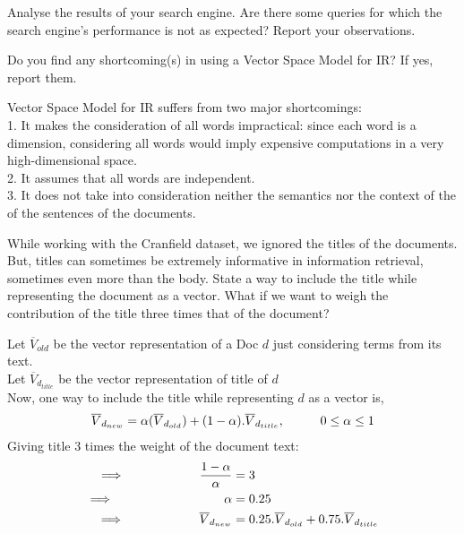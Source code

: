 \documentclass[11pt]{exam}
\newcommand\tab[1][1cm]{\hspace*{#1}}
\begin{document}
\begin{questions}
\question Analyse the results of your search engine. Are there some queries for which the search
engine’s performance is not as expected? Report your observations.


\question Do you find any shortcoming(s) in using a Vector Space Model for IR? If yes, report them.
\begin{solution}
    Vector Space Model for IR suffers from two major shortcomings:\\
    1. It makes the consideration of all words impractical: since each word is a dimension, considering all words would imply expensive computations in a very high-dimensional space.\\
    2. It assumes that all words are independent.\\
    3. It does not take into consideration neither the semantics nor the context of the of the sentences of the documents.
    
\end{solution}

\question While working with the Cranfield dataset, we ignored the titles of the documents. But,
titles can sometimes be extremely informative in information retrieval, sometimes even
more than the body. State a way to include the title while representing the document as
a vector. What if we want to weigh the contribution of the title three times that of the
document?
\begin{solution}
    Let $\overline{V}_{old}$ be the vector representation of a Doc $d$ just considering terms from its text.\\
    Let $\overline{V}_{d_{title}}$ be the vector representation of title of $d$\\
    Now, one way to include the title while representing $d$ as a vector is, \\
    \begin{align}
        \overline{V}_{d_{new}} = \alpha(\overline{V}_{d_{old}}) + (1-\alpha).\overline{V}_{d_{title}} ,\tab 0\leq\alpha\leq1
    \end{align}
    Giving title 3 times the weight of the document text:
    \begin{align*}
        \implies \tab\tab \frac{1-\alpha}{\alpha} &= 3\\
        \implies \tab\tab\tab \alpha &= 0.25\\
        \implies \tab\tab \overline{V}_{d_{new}} &= 0.25.\overline{V}_{d_{old}} + 0.75.\overline{V}_{d_{title}}
    \end{align*}
    

\end{solution}
\end{questions}
\end{document}
